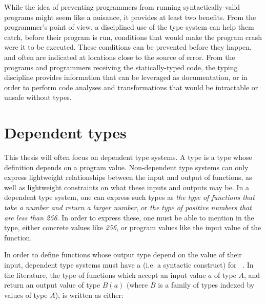 While the idea of preventing programmers from running syntactically-valid
programs might seem like a nuisance, it provides at least two benefits.  From
the programmer's point of view, a disciplined use of the type system can help
them catch, before their program is run, conditions that would make the program
crash were it to be executed.  These conditions can be prevented before they
happen, and often are indicated at locations close to the source of error.  From
the programs and programmers receiving the statically-typed code, the typing
discipline provides information that can be leveraged as documentation, or in
order to perform code analyses and transformations that would be intractable or
unsafe without types.

\section{Dependent types}
\label{dependent-types}

This thesis will often focus on dependent type systems.  A 
type is a type whose definition depends on a program value.  Non-dependent type
systems can only express lightweight relationships between the input and output
of functions, as well as lightweight constraints on what these inputs and
outputs may be.  In a dependent type system, one can express such types as
\textit{the type of functions that take a number and return a larger number}, or
\textit{the type of positive numbers that are less than 256}.  In order to
express these, one must be able to mention in the type, either concrete values
like \textit{256}, or program values like the input value of the function.

In order to define functions whose output type depend on the value of their
input, dependent type systems must have a  (i.e. a syntactic
construct) for ~\footnotemark.  In the literature,
the type of functions which accept an input value $a$ of type $A$, and return an
output value of type $B(a)$ (where $B$ is a family of types indexed by values of
type $A$), is written as either:


